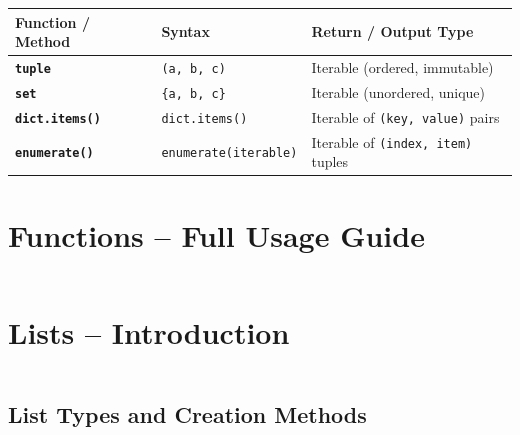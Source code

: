 \documentclass[a4paper,11pt]{article}
\begin{document}
	\begin{tabular}{>{\bfseries}p{4cm} p{7.5cm} p{3cm}}
		\toprule
		Function / Method & Syntax & Return / Output Type \\
		\midrule
		
		\texttt{tuple} & \texttt{(a, b, c)} & Iterable (ordered, immutable) \\
		
		\texttt{set} & \texttt{\{a, b, c\}} & Iterable (unordered, unique) \\
		
		\texttt{dict.items()} & \texttt{dict.items()} & Iterable of \texttt{(key, value)} pairs \\
		
		\texttt{enumerate()} & \texttt{enumerate(iterable)} & Iterable of \texttt{(index, item)} tuples \\
		
		\bottomrule
	\end{tabular}
	
		\newpage
	\section{Functions – Full Usage Guide}
	\inputminted{python}{Python_Files/functions_guid.py}
	
		\newpage
	
	\section{Lists – Introduction}
	\inputminted{python}{Python_Files/list_intro_guid.py}
	
	\vspace{1em}
	\subsection*{List Types and Creation Methods}
	
\end{document}
